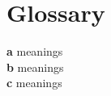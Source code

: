\backmatter
\twocolumn

\chapter{Glossary}\label{glossary}
\linespread{1.3} \small

\noindent \textbf{a} meanings\\
\noindent \textbf{b} meanings\\
\noindent \textbf{c} meanings\\
